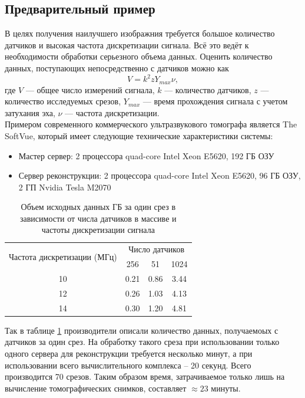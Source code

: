 \documentclass[14pt]{matmex-diploma}
\begin{document}
\subsection{Предварительный пример}
В целях получения наилучшего изображния требуется большое количество датчиков и высокая частота дискретизации сигнала. Всё это ведёт к необходимости обработки серьезного объема данных. Оценить количество данных, поступающих непосредственно с датчиков можно как
\[ V = k^2  z  Y_{max} \nu,   \]
где $V$ --- общее число измерений сигнала, $k$ --- количество датчиков, $z$ --- количество исследуемых срезов, $Y_{max}$ --- время прохождения сигнала с учетом затухания эха, $\nu$ --- частота дискретизации. \\
Примером современного коммерческого ультразвукового томографа является The SoftVue\cite{roy2013breast}, который имеет следующие технические характеристики системы:
\begin{itemize}
\item Мастер сервер: 2 процессора quad-core Intel Xeon E5620, 192 ГБ ОЗУ
\item Сервер реконструкции: 2 процессора quad-core Intel Xeon E5620, 96 ГБ ОЗУ, 2 ГП Nvidia Tesla M2070
\end{itemize}

\begin{table}[h]
\centering
\begin{tabular}{ c | c | c | c }
    \hline
    \multirow{2}{*}{Частота дискретизации (МГц)} & \multicolumn{3}{c}{Число датчиков}  \\ \cline{2-4}
    & 256 & 51 & 1024 \\
    
    \hline
    10 & 0.21 & 0.86 & 3.44 \\
    12 & 0.26 & 1.03 & 4.13 \\
    14 & 0.30 & 1.20 & 4.81 \\
    \hline
\end{tabular}
\caption{Объем исходных данных ГБ за один срез в зависимости от числа датчиков в массиве и частоты дискретизации сигнала \cite{roy2013breast}}
\label{table:datasize_ex}
\end{table}
Так в таблице \ref{table:datasize_ex} производители описали количество данных, получаемоых с датчиков за один срез. На обработку такого среза при использовании только одного сервера для реконструкции требуется несколько минут, а при использовании всего вычислительного комплекса -- 20 секунд. Всего производится 70 срезов\cite{roy2013breast}. Таким образом время, затрачиваемое только лишь на вычисление томографических снимков, составляет $\approx 23 $ минуты.
\end{document}
